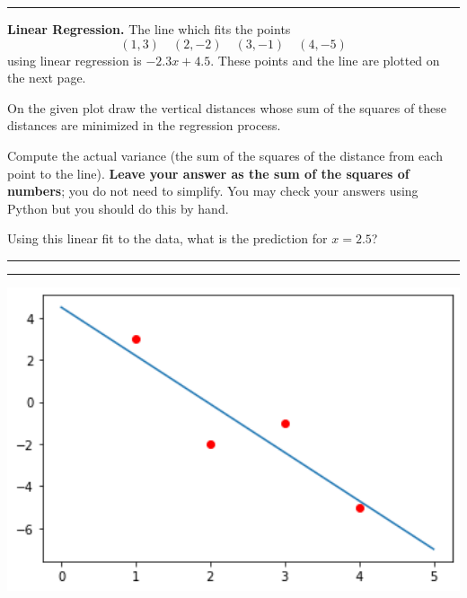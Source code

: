 \documentclass{article}
\begin{document}
\medskip \hrule \medskip

\item{\bf Linear Regression. }  The line which fits the points
$$ (1,3) \quad (2,-2) \quad (3,-1) \quad (4, -5)
$$
using linear regression is $-2.3x+4.5$.  These points and the line are plotted on the next page.  
\benum

\item On the given plot draw the vertical distances whose sum of the squares of these distances are minimized in the regression process.
\item Compute the actual variance (the sum of the squares of the distance from each point to the line).   {\bf Leave your answer as the sum of the squares of numbers}; you do not need to simplify. You may check your answers using Python but you should do this by hand.
\item Using this linear fit to the data, what is the prediction for $x=2.5$?
  \eenum  \eenum
 \bigskip\hrule\smallskip\hrule
\bigskip
\newpage
\bcenter
\includegraphics[width=7in] {hwk3}
\ecenter

 
\end{document}
